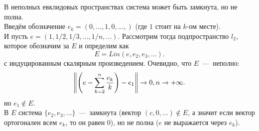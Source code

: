 \begin{note}
    В неполных евклидовых пространствах система может быть замкнута, но не полна. \\
    Введём обозначение $e_k = (0, \ldots, 1, 0, \ldots,)$ (где $1$ стоит на $k$-ом месте). \\
    И пусть $e = (1, 1/2, 1/3, \ldots, 1/n, \ldots)$.
    Рассмотрим тогда подпространство $l_2$, которое обозначим за $E$ и определим как
    \[
        E = Lin(e, e_2, e_3, \ldots).
    \]
    с индуцированным скалярным произведением.
    Очевидно, что $E$~---~неполно:
    \[
        \left\|\left(e - \sum\limits_{k = 2}^n \dfrac{e_k}{k}\right) - e_1\right\| \rightarrow 0, n \rightarrow +\infty.
    \]
    но $e_1 \notin E$. \\
    В $E$ система $\{e_2, e_3, \ldots\}$~---~замкнута (вектор $(c, 0, \ldots) \notin E$, а значит если вектор ортогонален всем $e_k$, то он равен 0), но не полна ($e$ не выражается через $e_k$).
\end{note}


